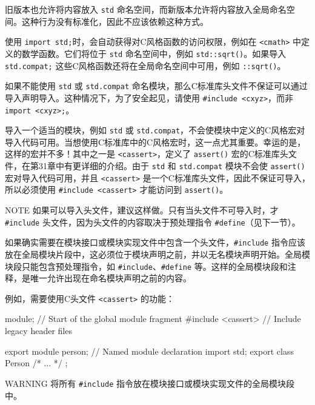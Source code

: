 旧版本也允许将内容放入 \verb|std| 命名空间，而新版本允许将内容放入全局命名空间。这种行为没有标准化，因此不应该依赖这种方式。

使用 \verb|import std;|时，会自动获得对C风格函数的访问权限，例如在 \verb|<cmath>| 中定义的数学函数。它们将位于 \verb|std| 命名空间中，例如 \verb|std::sqrt()|。如果导入 \verb|std.compat;| 这些C风格函数还将在全局命名空间中可用，例如 \verb|::sqrt()|。

如果不能使用 \verb|std| 或 \verb|std.compat| 命名模块，那么C标准库头文件不保证可以通过导入声明导入。这种情况下，为了安全起见，请使用 \verb|#include <cxyz>|，而非 \verb|import <cxyz>;|。

导入一个适当的模块，例如 \verb|std| 或 \verb|std.compat|，不会使模块中定义的C风格宏对导入代码可用。当想使用C标准库中的C风格宏时，这一点尤其重要。幸运的是，这样的宏并不多！其中之一是 \verb|<cassert>|，定义了 \verb|assert()| 宏的C标准库头文件，在第31章中有更详细的介绍。由于 \verb|std| 和 \verb|std.compat| 模块不会使 \verb|assert()| 宏对导入代码可用，并且 \verb|<cassert>| 是一个C标准库头文件，因此不保证可导入，所以必须使用 \verb|#include <cassert>| 才能访问到 \verb|assert()|。

\begin{myNotic}{NOTE}
如果可以导入头文件，建议这样做。只有当头文件不可导入时，才 \verb|#include| 头文件，因为头文件的内容取决于预处理指令 \verb|#define|（见下一节）。
\end{myNotic}

如果确实需要在模块接口或模块实现文件中包含一个头文件，\verb|#include| 指令应该放在全局模块片段中，这必须位于模块声明之前，并以无名模块声明开始。全局模块段只能包含预处理指令，如 \verb|#include|、\verb|#define| 等。这样的全局模块段和注释，是唯一允许出现在命名模块声明之前的内容。

例如，需要使用C头文件 \verb|<cassert>| 的功能：

\begin{cpp}
module; // Start of the global module fragment
#include <cassert> // Include legacy header files

export module person; // Named module declaration
import std;
export class Person { /* ... */ };
\end{cpp}

\begin{myWarning}{WARNING}
将所有 \verb|#include| 指令放在模块接口或模块实现文件的全局模块段中。
\end{myWarning}











